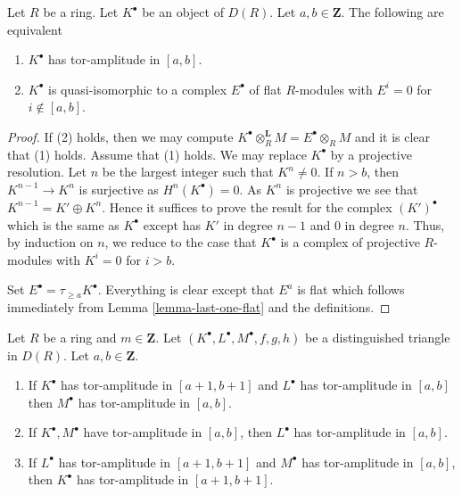 \begin{lemma}
\label{lemma-tor-amplitude}
Let $R$ be a ring. Let $K^\bullet$ be an object of $D(R)$.
Let $a, b \in \mathbf{Z}$. The following are equivalent
\begin{enumerate}
\item $K^\bullet$ has tor-amplitude in $[a, b]$.
\item $K^\bullet$ is quasi-isomorphic to a complex
$E^\bullet$ of flat $R$-modules with $E^i = 0$ for $i \not \in [a, b]$.
\end{enumerate}
\end{lemma}

\begin{proof}
If (2) holds, then we may compute
$K^\bullet \otimes_R^\mathbf{L} M = E^\bullet \otimes_R M$
and it is clear that (1) holds.
Assume that (1) holds. We may replace $K^\bullet$ by
a projective resolution. 
Let $n$ be the largest integer such that $K^n \not = 0$.
If $n > b$, then $K^{n - 1} \to K^n$ is surjective as
$H^n(K^\bullet) = 0$. As $K^n$ is projective we see that
$K^{n - 1} = K' \oplus K^n$. Hence it suffices to prove the result
for the complex $(K')^\bullet$ which is the same as $K^\bullet$
except has $K'$ in degree $n - 1$ and $0$ in degree $n$.
Thus, by induction on $n$, we reduce to the case that $K^\bullet$
is a complex of projective $R$-modules with $K^i = 0$ for $i > b$.

\medskip\noindent
Set $E^\bullet = \tau_{\geq a}K^\bullet$. Everything is clear except
that $E^a$ is flat which follows immediately from
Lemma \ref{lemma-last-one-flat}
and the definitions.
\end{proof}

\begin{lemma}
\label{lemma-cone-tor-amplitude}
Let $R$ be a ring and $m \in \mathbf{Z}$.
Let $(K^\bullet, L^\bullet, M^\bullet, f, g, h)$ be a distinguished
triangle in $D(R)$. Let $a, b \in \mathbf{Z}$.
\begin{enumerate}
\item If $K^\bullet$ has tor-amplitude in $[a + 1, b + 1]$ and
$L^\bullet$ has tor-amplitude in $[a, b]$ then $M^\bullet$ has
tor-amplitude in $[a, b]$.
\item If $K^\bullet, M^\bullet$ have tor-amplitude in $[a, b]$, then
$L^\bullet$ has tor-amplitude in $[a, b]$.
\item If $L^\bullet$ has tor-amplitude in $[a + 1, b + 1]$
and $M^\bullet$ has tor-amplitude in $[a, b]$, then
$K^\bullet$ has tor-amplitude in $[a + 1, b + 1]$.
\end{enumerate}
\end{lemma}

